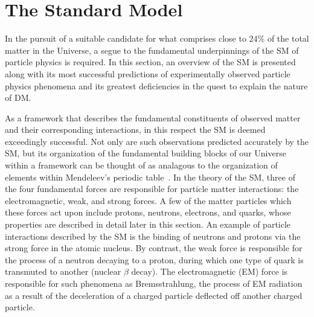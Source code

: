 
\section{The Standard Model}
\label{sec:SM}

In the pursuit of a suitable candidate for what comprises close to $24\%$ of the total matter in the Universe, a segue to the fundamental underpinnings of the SM of particle physics is required. In this section, an overview of the SM is presented along with its most successful predictions of experimentally observed particle physics phenomena and its greatest deficiencies in the quest to explain the nature of DM. 

As a framework that describes the fundamental constituents of observed matter and their corresponding interactions, in this respect the SM is deemed exceedingly successful. Not only are such observations predicted accurately by the SM, but its organization of the fundamental building blocks of our Universe within a framework can be thought of as analagous to the organization of elements within Mendeleev's periodic table~\cite{PhysRevD.86.010001}. In the theory of the SM, three of the four fundamental forces are responsible for particle matter interactions: the electromagnetic, weak, and strong forces. A few of the matter particles which these forces act upon include protons, neutrons, electrons, and quarks, whose properties are described in detail later in this section. An example of particle interactions described by the SM is the binding of neutrons and protons via the strong force in the atomic nucleus. By contrast, the weak force is responsible for the process of a neutron decaying to a proton, during which one type of quark is transmuted to another (nuclear $\beta$ decay). The electromagnetic (EM) force is responsible for such phenomena as Bremsstrahlung, the process of EM radiation as a result of the deceleration of a charged particle deflected off another charged particle. 

